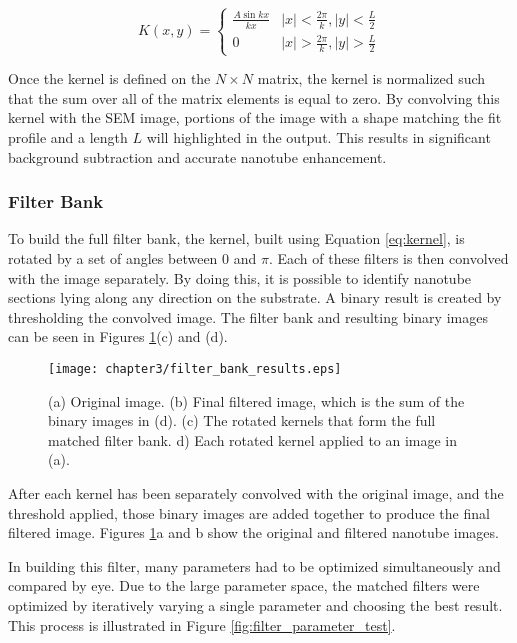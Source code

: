 \begin{equation} 
\label{eq:kernel}
K(x,y) = \begin{cases} \frac{A\sin{kx}}{kx} & |x| < \frac{2\pi}{k}, |y| < \frac{L}{2} \\ 
                       0                    & |x| > \frac{2\pi}{k},  |y| > \frac{L}{2}
       \end{cases}
\end{equation}

Once the kernel is defined on the $N \times N$ matrix, the kernel is normalized such that the sum over all of the matrix elements is equal to zero. By convolving this kernel with the SEM image, portions of the image with a shape matching the fit profile and a length $L$ will highlighted in the output. This results in significant background subtraction and accurate nanotube enhancement. 

\subsubsection{Filter Bank}

To build the full filter bank, the kernel, built using Equation \ref{eq:kernel}, is rotated by a set of angles between $0$ and $\pi$. Each of these filters is then convolved with the image separately. By doing this, it is possible to identify nanotube sections lying along any direction on the substrate. A binary result is created by thresholding the convolved image. The filter bank and resulting binary images can be seen in Figures \ref{fig:filter_bank_results}(c) and (d). 

\begin{figure}
	\centering
	\texttt{[image: chapter3/filter\_bank\_results.eps]}
	\caption{(a) Original image. (b) Final filtered image, which is the sum of the binary images in (d). (c) The rotated kernels that form the full matched filter bank. d) Each rotated kernel applied to an image in (a).}
	\label{fig:filter_bank_results}
\end{figure}

After each kernel has been separately convolved with the original image, and the threshold applied, those binary images are added together to produce the final filtered image. Figures \ref{fig:filter_bank_results}a and b show the original and filtered nanotube images. 

In building this filter, many parameters had to be optimized simultaneously and compared by eye. Due to the large parameter space, the matched filters were optimized by iteratively varying a single parameter and choosing the best result. This process is illustrated in Figure \ref{fig:filter_parameter_test}.

